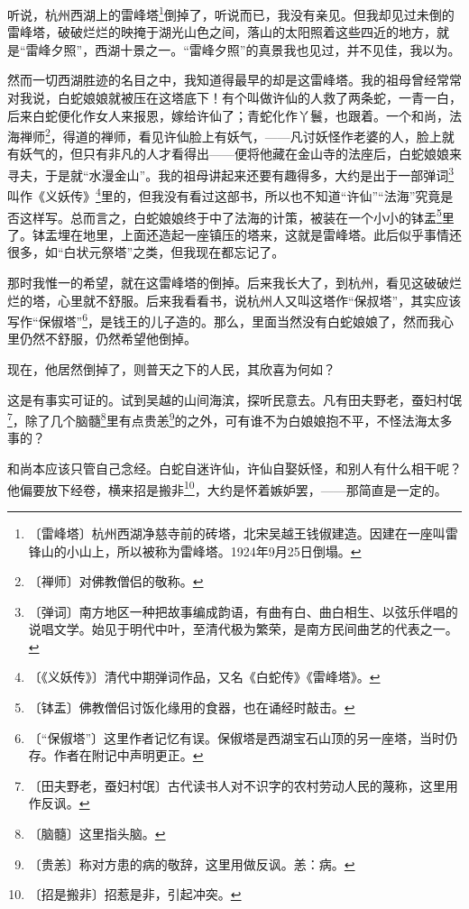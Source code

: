 \documentclass[12pt,UTF-8,openany]{ctexbook}
\begin{document}
\begin{normalsize}
    
    听说，杭州西湖上的雷峰塔\footnote{〔雷峰塔〕杭州西湖净慈寺前的砖塔，北宋吴越王钱俶建造。因建在一座叫雷锋山的小山上，所以被称为雷峰塔。1924年9月25日倒塌。}倒掉了，听说而已，我没有亲见。但我却见过未倒的雷峰塔，破破烂烂的映掩于湖光山色之间，落山的太阳照着这些四近的地方，就是“雷峰夕照”，西湖十景之一。“雷峰夕照”的真景我也见过，并不见佳，我以为。
    
    然而一切西湖胜迹的名目之中，我知道得最早的却是这雷峰塔。我的祖母曾经常常对我说，白蛇娘娘就被压在这塔底下！有个叫做许仙的人救了两条蛇，一青一白，后来白蛇便化作女人来报恩，嫁给许仙了；青蛇化作丫鬟，也跟着。一个和尚，法海禅师\footnote{〔禅师〕对佛教僧侣的敬称。}，得道的禅师，看见许仙脸上有妖气，——凡讨妖怪作老婆的人，脸上就有妖气的，但只有非凡的人才看得出——便将他藏在金山寺的法座后，白蛇娘娘来寻夫，于是就“水漫金山”。我的祖母讲起来还要有趣得多，大约是出于一部弹词\footnote{〔弹词〕南方地区一种把故事编成韵语，有曲有白、曲白相生、以弦乐伴唱的说唱文学。始见于明代中叶，至清代极为繁荣，是南方民间曲艺的代表之一。}叫作《义妖传》\footnote{〔《义妖传》〕清代中期弹词作品，又名《白蛇传》《雷峰塔》。}里的，但我没有看过这部书，所以也不知道“许仙”“法海”究竟是否这样写。总而言之，白蛇娘娘终于中了法海的计策，被装在一个小小的钵盂\footnote{〔钵盂〕佛教僧侣讨饭化缘用的食器，也在诵经时敲击。}里了。钵盂埋在地里，上面还造起一座镇压的塔来，这就是雷峰塔。此后似乎事情还很多，如“白状元祭塔”之类，但我现在都忘记了。
    
    那时我惟一的希望，就在这雷峰塔的倒掉。后来我长大了，到杭州，看见这破破烂烂的塔，心里就不舒服。后来我看看书，说杭州人又叫这塔作“保叔塔”，其实应该写作“保俶塔”\footnote{〔“保俶塔”〕这里作者记忆有误。保俶塔是西湖宝石山顶的另一座塔，当时仍存。作者在附记中声明更正。}，是钱王的儿子造的。那么，里面当然没有白蛇娘娘了，然而我心里仍然不舒服，仍然希望他倒掉。
    
    现在，他居然倒掉了，则普天之下的人民，其欣喜为何如？
    
    这是有事实可证的。试到吴越的山间海滨，探听民意去。凡有田夫野老，蚕妇村氓\footnote{〔田夫野老，蚕妇村氓〕古代读书人对不识字的农村劳动人民的蔑称，这里用作反讽。}，除了几个脑髓\footnote{〔脑髓〕这里指头脑。}里有点贵恙\footnote{〔贵恙〕称对方患的病的敬辞，这里用做反讽。恙：病。}的之外，可有谁不为白娘娘抱不平，不怪法海太多事的？
    
    和尚本应该只管自己念经。白蛇自迷许仙，许仙自娶妖怪，和别人有什么相干呢？他偏要放下经卷，横来招是搬非\footnote{〔招是搬非〕招惹是非，引起冲突。}，大约是怀着嫉妒罢，——那简直是一定的。
    

\end{normalsize}
\end{document}
